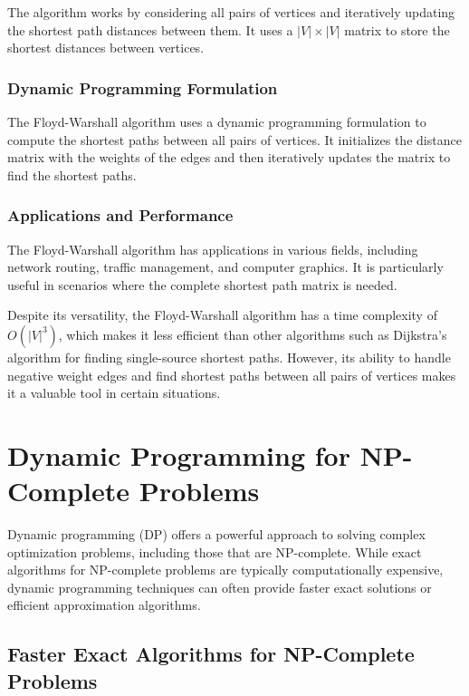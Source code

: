 \documentclass[12pt]{book} %
\begin{document}
The algorithm works by considering all pairs of vertices and iteratively updating the shortest path distances between them. It uses a \(|V| \times |V|\) matrix to store the shortest distances between vertices.

\subsubsection{Dynamic Programming Formulation}

The Floyd-Warshall algorithm uses a dynamic programming formulation to compute the shortest paths between all pairs of vertices. It initializes the distance matrix with the weights of the edges and then iteratively updates the matrix to find the shortest paths.

\subsubsection{Applications and Performance}

The Floyd-Warshall algorithm has applications in various fields, including network routing, traffic management, and computer graphics. It is particularly useful in scenarios where the complete shortest path matrix is needed.

Despite its versatility, the Floyd-Warshall algorithm has a time complexity of \(O(|V|^3)\), which makes it less efficient than other algorithms such as Dijkstra's algorithm for finding single-source shortest paths. However, its ability to handle negative weight edges and find shortest paths between all pairs of vertices makes it a valuable tool in certain situations.

\section{Dynamic Programming for NP-Complete Problems}

Dynamic programming (DP) offers a powerful approach to solving complex optimization problems, including those that are NP-complete. While exact algorithms for NP-complete problems are typically computationally expensive, dynamic programming techniques can often provide faster exact solutions or efficient approximation algorithms.

\subsection{Faster Exact Algorithms for NP-Complete Problems}
\end{document}
